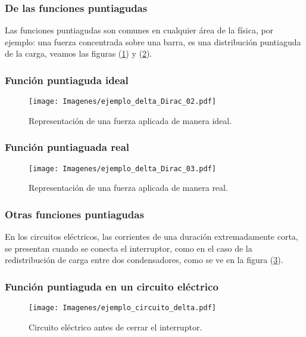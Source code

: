 \documentclass[12pt]{beamer}
\begin{document}
\begin{frame}
\frametitle{De las funciones puntiagudas}
Las funciones puntiagudas son comunes en cualquier área de la física, \pause por ejemplo: una fuerza concentrada sobre una barra, es una distribución puntiaguda de la carga, \pause veamos las figuras (\ref{fig:figura_delta_Dirac_02}) y (\ref{fig:figura_delta_Dirac_03}). 
\end{frame}

\begin{frame}
\frametitle{Función puntiaguda ideal}
\begin{figure}[H]
    \centering
    \texttt{[image: Imagenes/ejemplo\_delta\_Dirac\_02.pdf]}
    \caption{Representación de una fuerza aplicada de manera ideal.}
    \label{fig:figura_delta_Dirac_02}
\end{figure}
\end{frame}

\begin{frame}
\frametitle{Función puntiaguada real}
\begin{figure}[H]
    \centering
    \texttt{[image: Imagenes/ejemplo\_delta\_Dirac\_03.pdf]}
    \caption{Representación de una fuerza aplicada de manera real.}
    \label{fig:figura_delta_Dirac_03}
\end{figure}
\end{frame}

\begin{frame}
\frametitle{Otras funciones puntiagudas}
En los circuitos eléctricos, las corrientes  de una duración extremadamente corta, \pause se presentan cuando se conecta el interruptor, como en el caso de la redistribución de carga entre dos condensadores, como se ve en la figura (\ref{fig_figura_delta_Dirac_04}).
\end{frame}

\begin{frame}
\frametitle{Función puntiaguda en un circuito eléctrico}
\begin{figure}[H]
    \centering
    \texttt{[image: Imagenes/ejemplo\_circuito\_delta.pdf]}
    \caption{Circuito eléctrico antes de cerrar el interruptor.}
    \label{fig_figura_delta_Dirac_04}
\end{figure}
\end{frame}

\end{document}

